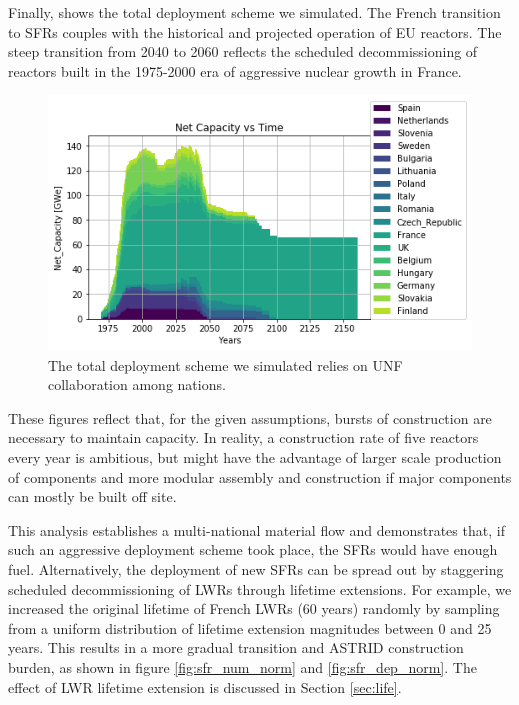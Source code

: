 Finally,  shows the total deployment scheme we simulated.  
The French transition to \glspl{SFR} couples with the historical and projected 
operation of \gls{EU} reactors.  The steep transition from 2040 to 2060 
reflects the scheduled decommissioning of reactors built in the 1975-2000 era 
of aggressive nuclear growth in France.

\begin{figure}[htbp!]
    \begin{center}
        \includegraphics[scale=0.6]{./images/eu_future/onesim.png}
    \end{center}
    \caption{The total deployment scheme we simulated relies on \gls{UNF} 
    collaboration among nations.} 
    \label{fig:tot_dep}
\end{figure}

These figures reflect that, for the given assumptions, bursts of construction
are necessary to maintain capacity.  In reality, a construction rate of five 
reactors every year is ambitious, but might have the advantage of
larger scale production of components and more modular assembly and construction if major components can mostly be built off site.

This analysis establishes a multi-national material flow and demonstrates that, if such an aggressive deployment scheme 
took place, the \glspl{SFR} would have enough fuel.  Alternatively, the 
deployment of new \glspl{SFR} can be spread out by staggering scheduled 
decommissioning of \glspl{LWR} through lifetime extensions. For example,
we increased the original lifetime of French \glspl{LWR} (60 years) randomly 
by sampling from a uniform distribution of lifetime extension
magnitudes between 0 and 25 years. 
This results in a more gradual transition and \gls{ASTRID} construction
burden, as shown in figure \ref{fig:sfr_num_norm} and \ref{fig:sfr_dep_norm}.
The effect of \gls{LWR} lifetime extension is discussed in Section \ref{sec:life}.

